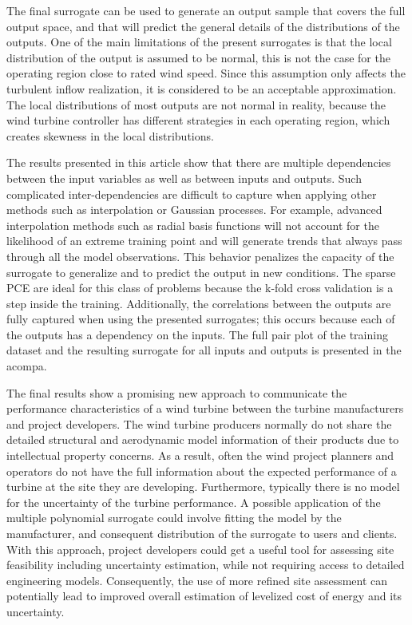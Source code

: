 \documentclass[preprint,12pt]{elsarticle}
\begin{document}
The final surrogate can be used to generate an output sample that covers the full output space, and that will predict the general details of the distributions of the outputs. One of the main limitations of the present surrogates is that the local distribution of the output is assumed to be normal, this is not the case for the operating region close to rated wind speed. Since this assumption only affects the turbulent inflow realization, it is considered to be an acceptable approximation. The local distributions of most outputs are not normal in reality, because the wind turbine controller has different strategies in each operating region, which creates skewness in the local distributions.

The results presented in this article show that there are multiple dependencies between the input variables as well as between inputs and outputs. Such complicated inter-dependencies are difficult to capture when applying other methods such as interpolation or Gaussian processes. For example, advanced interpolation methods such as radial basis functions will not account for the likelihood of an extreme training point and will generate trends that always pass through all the model observations. This behavior penalizes the capacity of the surrogate to generalize and to predict the output in new conditions. The sparse PCE are ideal for this class of problems because the k-fold cross validation is a step inside the training. Additionally, the correlations between the outputs are fully captured when using the presented surrogates; this occurs because each of the outputs has a dependency on the inputs. The full pair plot of the training dataset and the resulting surrogate for all inputs and outputs is presented in the acompa. %

The final results show a promising new approach to communicate the performance characteristics of a wind turbine between the turbine manufacturers and project developers. The wind turbine producers normally do not share the detailed structural and aerodynamic model information of their products due to intellectual property concerns. As a result, often the wind project planners and operators do not have the full information about the expected performance of a turbine at the site they are developing. Furthermore, typically there is no model for the uncertainty of the turbine performance. A possible application of the multiple polynomial surrogate could involve fitting the model by the manufacturer, and consequent distribution of the surrogate to users and clients. With this approach, project developers could get a useful tool for assessing site feasibility including uncertainty estimation, while not requiring access to detailed engineering models. Consequently, the use of more refined site assessment can potentially lead to improved overall estimation of levelized cost of energy and its uncertainty.
\end{document}
